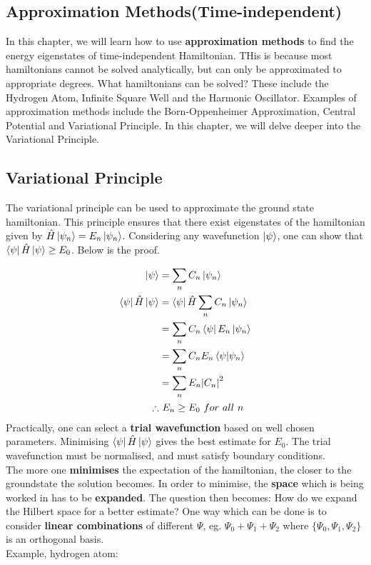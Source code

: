 \documentclass{article}
\begin{document}
\begin{flushleft}
\pagebreak
\section{Approximation Methods(Time-independent)}
In this chapter, we will learn how to use \textbf{approximation methods} to find the energy eigenstates of time-independent Hamiltonian. THis is because most hamiltonians cannot be solved analytically, but can only be approximated to appropriate degrees. What hamiltonians can be solved? These include the Hydrogen Atom, Infinite Square Well and the Harmonic Oscillator. Examples of approximation methods include the Born-Oppenheimer Approximation, Central Potential and Variational Principle. In this chapter, we will delve deeper into the Variational Principle.\\[.5cm]

\subsection{Variational Principle}
The variational principle can be used to approximate the ground state hamiltonian. This principle ensures that there exist eigenstates of the hamiltonian given by $\hat{H}\ket{\psi_n}=E_n\ket{\psi_n}$. Considering any wavefunction $\ket{\psi}$, one can show that $\bra{\psi}\hat{H}\ket{\psi}\geq E_0$. Below is the proof.

\begin{align*}
    \ket{\psi}&=\sum_n C_n\ket{\psi_n}\\
    \bra{\psi}\hat{H}\ket{\psi}&=\bra{\psi}\hat{H}\sum_n C_n\ket{\psi_n}\\
    &=\sum_n C_n\bra{\psi}E_n\ket{\psi_n}\\
    &=\sum_n C_nE_n\bra{\psi}\ket{\psi_n}\\
    &=\sum_n E_n \abs{C_n}^2\\
    \therefore&\ E_n\geq E_0\ for\ all\ n
\end{align*}
Practically, one can select a \textbf{trial wavefunction} based on well chosen parameters. Minimising $\bra{\psi}\hat{H}\ket{\psi}$ gives the best estimate for $E_0$. The trial wavefunction must be normalised, and must satisfy boundary conditions.\\[.5cm]

The more one \textbf{minimises} the expectation of the hamiltonian, the closer to the groundstate the solution becomes. In order to minimise, the \textbf{space} which is being worked in has to be \textbf{expanded}. The question then becomes: How do we expand the Hilbert space for a better estimate? One way which can be done is to consider \textbf{linear combinations} of different $\Psi$, eg. $\Psi_0+\Psi_1+\Psi_2$ where $\{\Psi_0,\Psi_1,\Psi_2\}$ is an orthogonal basis.\\
Example, hydrogen atom:


\end{flushleft}
\end{document}
